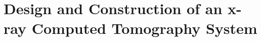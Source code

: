 \chapter{Design and Construction of an x-ray Computed Tomography System}
\label{chap:CT_design_construct}